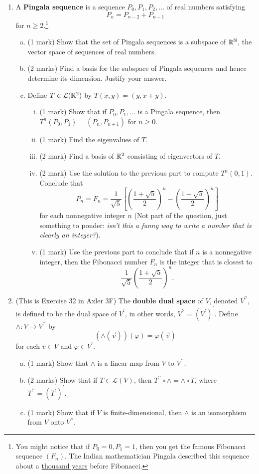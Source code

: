 \documentclass[12pt]{article}
\begin{document}
\begin{enumerate}
\item A \textbf{Pingala sequence} is a sequence $P_0,P_1,P_2,\ldots $ of real numbers satisfying
  \[
    P_n=P_{n-2}+P_{n-1}
  \]
  for $n\geq 2$.\footnote{You might notice that if $P_0=0,P_1=1$, then you get the famous Fibonacci sequence $(F_n)$. The Indian mathematician Pingala described this sequence about a \href{https://en.wikipedia.org/wiki/Fibonacci_sequence}{thousand years} before Fibonacci.}
  \begin{enumerate}[(a)]
  \item (1 mark) Show that the set of Pingala sequences is a subspace of $\mathbb{R}^{\mathbb{N}}$, the vector space of sequences of real numbers.
  \item (2 marks) Find a basis for the subspace of Pingala sequences and hence determine its dimension. Justify your answer.
  \item Define $T\in\mathcal{L}(\mathbb{R}^2)$ by $T(x,y)=(y,x+y)$.
    \begin{enumerate}[(i)]
    \item (1 mark) Show that if $P_0,P_1,\ldots $ is a Pingala sequence, then $T^n(P_0,P_1)=(P_{n},P_{n+1})$ for $n\geq 0$.
    \item (1 mark) Find the eigenvalues of $T$.
    \item (2 mark) Find a basis of $\mathbb{R}^2$ consisting of eigenvectors of $T$.
    \item (2 mark) Use the solution to the previous part to compute $T^n(0,1)$. Conclude that
      \[
        P_n=F_n=\frac{1}{\sqrt{5}}\left[ \left(\frac{1+\sqrt{5}}{2}\right)^n - \left(\frac{1-\sqrt{5}}{2}\right)^n\right]
      \]
      for each nonnegative integer $n$ (Not part of the question, just something to ponder: \textit{isn't this a funny way to write a number that is clearly an integer?}). 
    \item (1 mark) Use the previous part to conclude that if $n$ is a nonnegative integer, then the Fibonacci number $F_n$ is the integer that is closest to
      \[
        \frac{1}{\sqrt{5}}\left( \frac{1+\sqrt{5}}{2} \right)^n.
      \]
    \end{enumerate}
  \end{enumerate}
\item (This is Exercise 32 in Axler 3F) The \textbf{double dual space} of $V$, denoted $V^{\prime\prime}$, is defined to be the dual space of $V^\prime$, in other words, $V^{\prime\prime}=(V^{\prime})^{\prime}$. Define $\wedge:V\to V^{\prime\prime}$ by
  \[
    (\wedge(\vec v))(\varphi)=\varphi(\vec v)
  \]
  for each $v\in V$ and $\varphi\in V^\prime$.
  \begin{enumerate}[(a)]
  \item (1 mark) Show that $\wedge$ is a linear map from $V$ to $V^{\prime\prime}$.
  \item (2 marks) Show that if $T\in \mathcal{L}(V)$, then $T^{\prime\prime}\circ\wedge=\wedge\circ T$, where $T^{\prime\prime}=(T^\prime)^\prime$.
  \item (1 mark) Show that if $V$ is finite-dimensional, then $\wedge$ is an isomorphism from $V$ onto $V^{\prime\prime}$.
  \end{enumerate}
\end{enumerate}


{}

\end{document}
